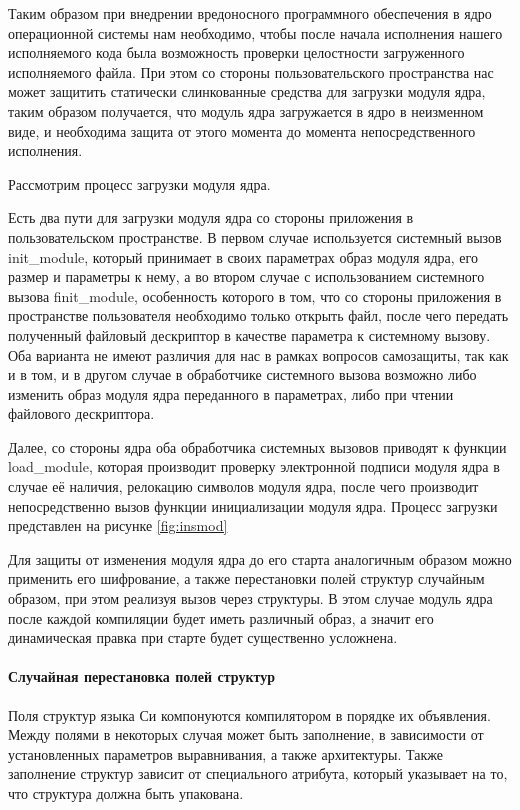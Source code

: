\documentclass{gost7.32-2001}
\begin{document}
Таким образом при внедрении вредоносного программного обеспечения в
ядро операционной системы нам необходимо, чтобы после начала
исполнения нашего исполняемого кода была возможность проверки
целостности загруженного исполняемого файла. При этом со стороны
пользовательского пространства нас может защитить статически
слинкованные средства для загрузки модуля ядра, таким образом
получается, что модуль ядра загружается в ядро в неизменном виде, и
необходима защита от этого момента до момента непосредственного
исполнения.

Рассмотрим процесс загрузки модуля ядра.

Есть два пути для загрузки модуля ядра со стороны приложения в
пользовательском пространстве. В первом случае используется системный
вызов init\_module, который принимает в своих параметрах образ модуля
ядра, его размер и параметры к нему, а во втором случае с
использованием системного вызова finit\_module, особенность которого в
том, что со стороны приложения в пространстве пользователя необходимо
только открыть файл, после чего передать полученный файловый
дескриптор в качестве параметра к системному вызову. Оба варианта не
имеют различия для нас в рамках вопросов самозащиты, так как и в том,
и в другом случае в обработчике системного вызова возможно либо
изменить образ модуля ядра переданного в параметрах, либо при чтении
файлового дескриптора.

Далее, со стороны ядра оба обработчика системных вызовов приводят к
функции load\_module, которая производит проверку электронной подписи
модуля ядра в случае её наличия, релокацию символов модуля ядра, после
чего производит непосредственно вызов функции инициализации модуля
ядра. Процесс загрузки представлен на рисунке \ref{fig:insmod}


Для защиты от изменения модуля ядра до его старта аналогичным образом
можно применить его шифрование, а также перестановки полей структур
случайным образом, при этом реализуя вызов через структуры. В этом
случае модуль ядра после каждой компиляции будет иметь различный
образ, а значит его динамическая правка при старте будет существенно
усложнена.

\paragraph{Случайная перестановка полей структур}

Поля структур языка Си компонуются компилятором в порядке их
объявления. Между полями в некоторых случая может быть заполнение, в
зависимости от установленных параметров выравнивания, а также
архитектуры. Также заполнение структур зависит от специального
атрибута, который указывает на то, что структура должна быть
упакована.
\end{document}
